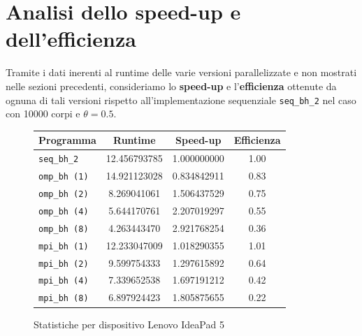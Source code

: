 \documentclass[12pt]{report}
\begin{document}
    \newpage

    \section{Analisi dello speed-up e dell'efficienza}

    Tramite i dati inerenti al runtime delle varie versioni parallelizzate e non mostrati nelle sezioni precedenti, consideriamo lo \textbf{speed-up} e l'\textbf{efficienza} ottenute da ognuna di tali versioni rispetto all'implementazione sequenziale \texttt{seq\_bh\_2} nel caso con 10000 corpi e $\theta = 0.5$.

    \begin{figure}[H]
        \centering

        \begin{tabular}{ l | c | c | c }
            \textbf{Programma} & \textbf{Runtime} & \textbf{Speed-up} & \textbf{Efficienza}\\
            \hline
            \texttt{seq\_bh\_2} & 12.456793785 & 1.000000000 & 1.00 \\
            \hline
            \texttt{omp\_bh (1)} & 14.921123028 & 0.834842911 & 0.83 \\
            \texttt{omp\_bh (2)} & 8.269041061 & 1.506437529 & 0.75 \\
            \texttt{omp\_bh (4)} & 5.644170761 & 2.207019297 & 0.55 \\
            \texttt{omp\_bh (8)} & 4.263443470 & 2.921768254 & 0.36 \\
            \hline
            \texttt{mpi\_bh (1)} & 12.233047009 & 1.018290355 & 1.01 \\
            \texttt{mpi\_bh (2)} & 9.599754333 & 1.297615892 & 0.64 \\
            \texttt{mpi\_bh (4)} & 7.339652538 & 1.697191212 & 0.42 \\
            \texttt{mpi\_bh (8)} & 6.897924423 & 1.805875655 & 0.22 \\
        \end{tabular}
        \caption{Statistiche per dispositivo Lenovo IdeaPad 5}
        \label{fig:stats_ip5_2}
    \end{figure}
\end{document}
